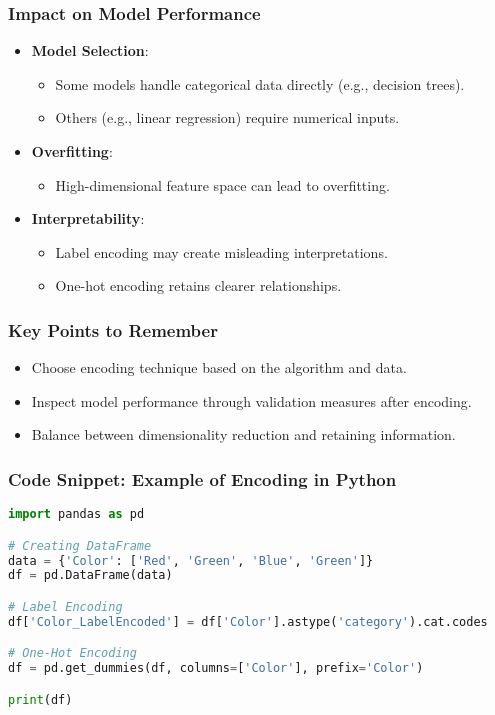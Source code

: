 \documentclass[aspectratio=169]{beamer}
\begin{document}
\begin{frame}[fragile]
    \frametitle{Impact on Model Performance}
    \begin{itemize}
        \item \textbf{Model Selection}:
            \begin{itemize}
                \item Some models handle categorical data directly (e.g., decision trees).
                \item Others (e.g., linear regression) require numerical inputs.
            \end{itemize}
        \item \textbf{Overfitting}:
            \begin{itemize}
                \item High-dimensional feature space can lead to overfitting.
            \end{itemize}
        \item \textbf{Interpretability}:
            \begin{itemize}
                \item Label encoding may create misleading interpretations.
                \item One-hot encoding retains clearer relationships.
            \end{itemize}
    \end{itemize}
\end{frame}

\begin{frame}[fragile]
    \frametitle{Key Points to Remember}
    \begin{itemize}
        \item Choose encoding technique based on the algorithm and data.
        \item Inspect model performance through validation measures after encoding.
        \item Balance between dimensionality reduction and retaining information.
    \end{itemize}
\end{frame}

\begin{frame}[fragile]
    \frametitle{Code Snippet: Example of Encoding in Python}
    \begin{lstlisting}[language=Python]
import pandas as pd

# Creating DataFrame
data = {'Color': ['Red', 'Green', 'Blue', 'Green']}
df = pd.DataFrame(data)

# Label Encoding
df['Color_LabelEncoded'] = df['Color'].astype('category').cat.codes

# One-Hot Encoding
df = pd.get_dummies(df, columns=['Color'], prefix='Color')

print(df)
    \end{lstlisting}
\end{frame}
\end{document}
